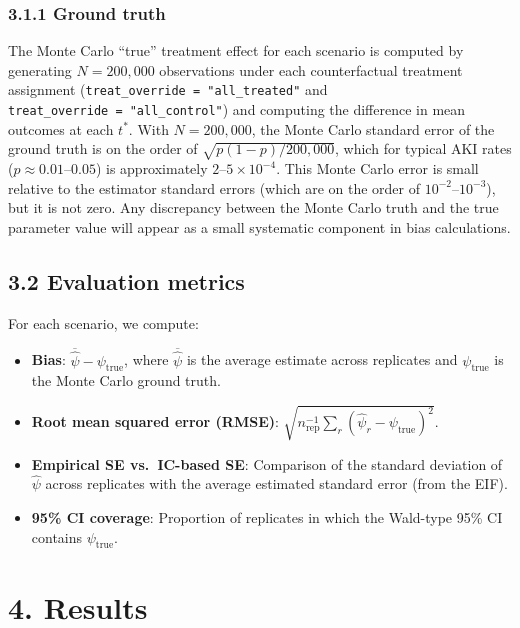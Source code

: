 \documentclass[
  letterpaper,
  DIV=11,
  numbers=noendperiod]{scrartcl}
\providecommand{\tightlist}{%
  \setlength{\itemsep}{0pt}\setlength{\parskip}{0pt}}\usepackage{longtable,booktabs,array}
\begin{document}
\subsubsection{3.1.1 Ground truth}\label{ground-truth}

The Monte Carlo ``true'' treatment effect for each scenario is computed
by generating \(N = 200{,}000\) observations under each counterfactual
treatment assignment (\texttt{treat\_override\ =\ "all\_treated"} and
\texttt{treat\_override\ =\ "all\_control"}) and computing the
difference in mean outcomes at each \(t^*\). With \(N = 200{,}000\), the
Monte Carlo standard error of the ground truth is on the order of
\(\sqrt{p(1-p)/200{,}000}\), which for typical AKI rates
(\(p \approx 0.01\text{--}0.05\)) is approximately
\(2\text{--}5 \times 10^{-4}\). This Monte Carlo error is small relative
to the estimator standard errors (which are on the order of
\(10^{-2}\text{--}10^{-3}\)), but it is not zero. Any discrepancy
between the Monte Carlo truth and the true parameter value will appear
as a small systematic component in bias calculations.

\subsection{3.2 Evaluation metrics}\label{evaluation-metrics}

For each scenario, we compute:

\begin{itemize}
\tightlist
\item
  \textbf{Bias}: \(\overline{\hat{\psi}} - \psi_{\text{true}}\), where
  \(\overline{\hat{\psi}}\) is the average estimate across replicates
  and \(\psi_{\text{true}}\) is the Monte Carlo ground truth.
\item
  \textbf{Root mean squared error (RMSE)}:
  \(\sqrt{n_{\text{rep}}^{-1} \sum_r (\hat{\psi}_r - \psi_{\text{true}})^2}\).
\item
  \textbf{Empirical SE vs.~IC-based SE}: Comparison of the standard
  deviation of \(\hat{\psi}\) across replicates with the average
  estimated standard error (from the EIF).
\item
  \textbf{95\% CI coverage}: Proportion of replicates in which the
  Wald-type 95\% CI contains \(\psi_{\text{true}}\).
\end{itemize}

\section{4. Results}\label{results}
\end{document}
